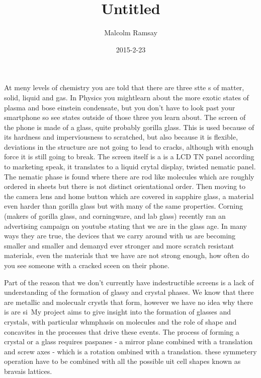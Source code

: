 \documentclass{article}
\title{Untitled}
\author{Malcolm Ramsay}
\date{2015-2-23}
\begin{document}
\maketitle

At meny levels of chemistry you are told that there are three stte s of matter, solid, liquid and gas. In Physics you mightlearn about the more exotic states of plasma and bose einstein condensate, but you don't have to look past your smartphone so see states outside of those three you learn about. The screen of the phone is made of a glass, quite probably gorilla glass. This is used because of its hardness and imperviousness to scratched, but also because it is flexible, deviations in the structure are not going to lead to cracks, although with enough force it is still going to break. The screen itself is a is a LCD TN panel according to marketing speak, it translates to a liquid crytal display, twisted nematic panel. The nematic phase is found where there are rod like molecules which are roughly ordered in sheets but there is not distinct orientational order\tocheck. Then moving to the camera lens and home button which are covered in sapphire glass, a material even harder than gorilla glass but with many of the same properties. Corning (makers of gorilla glass, and corningware, and lab glass) recently ran an advertising campaign on youtube stating that we are in the glass age. In many ways they are true, the devices that we carry around with us are becoming smaller and smaller and demanyd ever stronger and more scratch resistant materials, even the materials that we have are not strong enough, how often do you see someone with a cracked sceen on their phone. 

Part of the reason that we don't currently have indestructible screens is a lack of understanding of the formation of glassy and crystal phases. We know that there are metallic and molecualr crystls that form, however we have no idea why there is are si\
My project aims to give insight into the formation of glasses and crystals, with particular whmphasis on molecules and the role of shape and concavites in the processes that drive these events. The process of forming a crystal or a glass requires paspanes - a mirror plane combined with a translation and screw axes - which is a rotation ombined with a translation. these symmetery operation have to be combined with all the possible uit cell shapes known as bravais lattices. 
\end{document}
